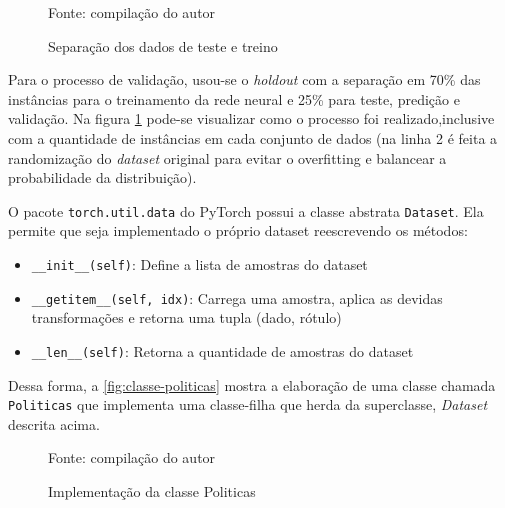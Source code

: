 \begin{figure}[h!]
	\centering
	\caption{Separação dos dados de teste e treino}
	
	\label{fig:separacao-teste-treino}
	{\scriptsize Fonte: compilação do autor}
\end{figure}

Para o processo de validação, usou-se o \textit{holdout} com a separação em 70\% das instâncias para o treinamento da rede neural e 25\% para teste, predição e validação. Na figura \ref{fig:separacao-teste-treino} pode-se visualizar como o processo foi realizado,inclusive com a quantidade de instâncias em cada conjunto de dados (na linha 2 é feita a randomização do \textit{dataset} original para evitar o overfitting e balancear a probabilidade da distribuição).

O pacote \texttt{torch.util.data} do PyTorch possui a classe abstrata \texttt{Dataset}. Ela permite que seja implementado o próprio dataset reescrevendo os métodos: 

\begin{itemize}	
	\item \verb|__init__(self)|: Define a lista de amostras do dataset
	\item \verb|__getitem__(self, idx)|: Carrega uma amostra, aplica as devidas transformações e retorna uma tupla (dado, rótulo)
	\item \verb|__len__(self)|: Retorna a quantidade de amostras do dataset
\end{itemize}

Dessa forma, a \autoref{fig:classe-politicas} mostra a elaboração de uma classe chamada \texttt{Politicas} que implementa uma classe-filha que herda da superclasse, \textit{Dataset} descrita acima.

\begin{figure}[h!]
	\centering
	\caption{Implementação da classe Politicas}
	
	\label{fig:classe-politicas}
	{\scriptsize Fonte: compilação do autor}
\end{figure}

